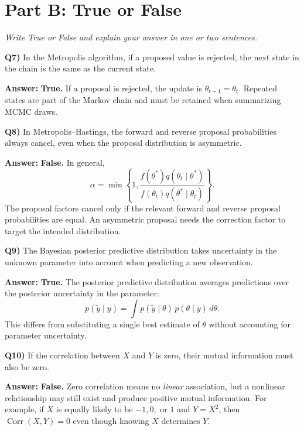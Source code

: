 \documentclass[12pt]{article}
\newenvironment{solution}{\par\smallskip\begingroup\color{blue}\noindent\textbf{Answer: }\smallskip}{\par\endgroup\medskip}
\newcommand{\question}[2]{\vspace{0.7em}\noindent\textbf{Q#1)}}
\begin{document}
\section*{Part B: True or False}
\textit{Write True or False and explain your answer in one or two sentences.}

\question{7}{}
In the Metropolis algorithm, if a proposed value is rejected, the next state in the chain is the same as the current state.
\vspace{0.8em}

\begin{solution}
\textbf{True.} If a proposal is rejected, the update is $\theta_{t+1}=\theta_t$.
Repeated states are part of the Markov chain and must be retained when summarizing MCMC draws.
\end{solution}

\question{8}{}
In Metropolis--Hastings, the forward and reverse proposal probabilities always cancel, even when the proposal distribution is asymmetric.
\vspace{0.8em}

\begin{solution}
\textbf{False.} In general,
\[\alpha=\min\!\left\{1,\frac{f(\theta^*)q(\theta_t\mid\theta^*)}{f(\theta_t)q(\theta^*\mid\theta_t)}\right\}.\]
The proposal factors cancel only if the relevant forward and reverse proposal probabilities are equal.
An asymmetric proposal needs the correction factor to target the intended distribution.
\end{solution}

\question{9}{}
The Bayesian posterior predictive distribution takes uncertainty in the unknown parameter into account when predicting a new observation.
\vspace{0.8em}

\begin{solution}
\textbf{True.} The posterior predictive distribution averages predictions over the posterior uncertainty in the parameter:
\[p(\widetilde y\mid y)=\int p(\widetilde y\mid\theta)\,p(\theta\mid y)\,d\theta.\]
This differs from substituting a single best estimate of $\theta$ without accounting for parameter uncertainty.
\end{solution}

\question{10}{}
If the correlation between $X$ and $Y$ is zero, their mutual information must also be zero.
\vspace{0.8em}

\begin{solution}
\textbf{False.} Zero correlation means no \emph{linear} association, but a nonlinear relationship may still exist and produce positive mutual information.
For example, if $X$ is equally likely to be $-1,0,$ or $1$ and $Y=X^2$, then $\operatorname{Corr}(X,Y)=0$ even though knowing $X$ determines $Y$.
\end{solution}
\end{document}
